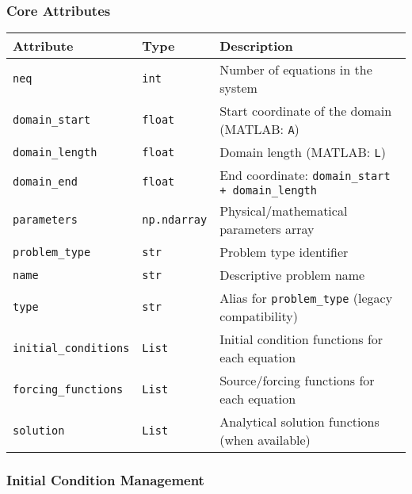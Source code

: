 \subsubsection{Core Attributes}

\begin{longtable}{|p{3.7cm}|p{2.5cm}|p{7cm}|}
\hline
\textbf{Attribute} & \textbf{Type} & \textbf{Description} \\
\hline
\endhead

\texttt{neq} & \texttt{int} & Number of equations in the system \\
\hline

\texttt{domain\_start} & \texttt{float} & Start coordinate of the domain (MATLAB: \texttt{A}) \\
\hline

\texttt{domain\_length} & \texttt{float} & Domain length (MATLAB: \texttt{L}) \\
\hline

\texttt{domain\_end} & \texttt{float} & End coordinate: \texttt{domain\_start + domain\_length} \\
\hline

\texttt{parameters} & \texttt{np.ndarray} & Physical/mathematical parameters array \\
\hline

\texttt{problem\_type} & \texttt{str} & Problem type identifier \\
\hline

\texttt{name} & \texttt{str} & Descriptive problem name \\
\hline

\texttt{type} & \texttt{str} & Alias for \texttt{problem\_type} (legacy compatibility) \\
\hline

\texttt{initial\_conditions} & \texttt{List} & Initial condition functions for each equation \\
\hline

\texttt{forcing\_functions} & \texttt{List} & Source/forcing functions for each equation \\
\hline

\texttt{solution} & \texttt{List} & Analytical solution functions (when available) \\
\hline

\end{longtable}

\subsubsection{Initial Condition Management}

